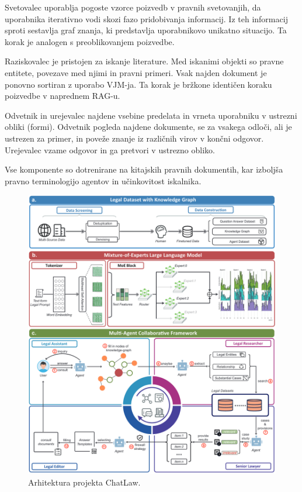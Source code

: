 \documentclass[a4paper,12pt,openright]{book}
\begin{document}
Svetovalec uporablja pogoste vzorce poizvedb v pravnih svetovanjih, da uporabnika iterativno vodi skozi fazo pridobivanja informacij. Iz teh informacij sproti sestavlja graf znanja, ki predstavlja uporabnikovo unikatno situacijo. Ta korak je analogen s preoblikovanjem poizvedbe.

Raziskovalec je pristojen za iskanje literature. Med iskanimi objekti so pravne entitete, povezave med njimi in pravni primeri. Vsak najden dokument je ponovno sortiran z uporabo VJM-ja. Ta korak je bržkone identičen koraku poizvedbe v naprednem RAG-u.

Odvetnik in urejevalec najdene vsebine predelata in vrneta uporabniku v ustrezni obliki (formi). Odvetnik pogleda najdene dokumente, se za vsakega odloči, ali je ustrezen za primer, in poveže znanje iz različnih virov v končni odgovor. Urejevalec vzame odgovor in ga pretvori v ustrezno obliko.

Vse komponente so dotrenirane na kitajskih pravnih dokumentih, kar izboljša pravno terminologijo agentov in učinkovitost iskalnika.

\begin{figure}[htbp]
	\centering
	\includegraphics[width=\textwidth]{chatlaw.png}
	\caption{Arhitektura projekta ChatLaw.}
	\label{chatlaw}
\end{figure}
\end{document}
